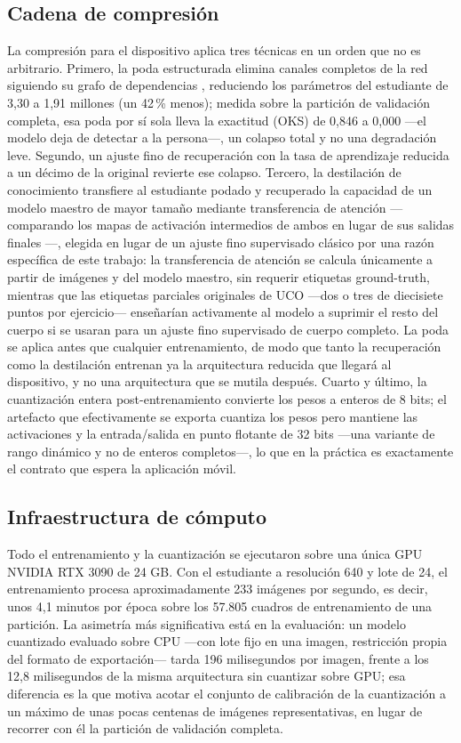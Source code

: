 \documentclass[10pt,a4paper,twocolumn]{article}
\begin{document}
\subsection{Cadena de compresión}
\label{sec:cadena}
La compresión para el dispositivo aplica tres técnicas en un orden que no es
arbitrario. Primero, la poda estructurada elimina canales completos de la red
siguiendo su grafo de dependencias \cite{fang2023}, reduciendo los parámetros
del estudiante de 3,30 a 1,91 millones (un 42\,\% menos); medida sobre la
partición de validación completa, esa poda por sí sola lleva la exactitud
(OKS) de 0,846 a 0,000 —el modelo deja de detectar a la persona—, un colapso
total y no una degradación leve. Segundo, un ajuste fino de recuperación con
la tasa de aprendizaje reducida a un décimo de la original revierte ese
colapso. Tercero, la destilación de conocimiento transfiere al estudiante
podado y recuperado la capacidad de un modelo maestro de mayor tamaño
mediante transferencia de atención \cite{zagoruyko2017} —comparando los
mapas de activación intermedios de ambos en lugar de sus salidas finales
\cite{hinton2015}—, elegida en lugar de un ajuste fino supervisado clásico
por una razón específica de este trabajo: la transferencia de atención se
calcula únicamente a partir de imágenes y del modelo maestro, sin requerir
etiquetas ground-truth, mientras que las etiquetas parciales originales de
UCO —dos o tres de diecisiete puntos por ejercicio— enseñarían activamente
al modelo a suprimir el resto del cuerpo si se usaran para un ajuste fino
supervisado de cuerpo completo. La poda se aplica antes que cualquier
entrenamiento, de modo que tanto la recuperación como la destilación entrenan
ya la arquitectura reducida que llegará al dispositivo, y no una arquitectura
que se mutila después. Cuarto y último, la cuantización entera
post-entrenamiento \cite{jacob2018} convierte los pesos a enteros de 8 bits;
el artefacto que efectivamente se exporta cuantiza los pesos pero mantiene
las activaciones y la entrada/salida en punto flotante de 32 bits —una
variante de rango dinámico y no de enteros completos—, lo que en la práctica
es exactamente el contrato que espera la aplicación móvil.

\subsection{Infraestructura de cómputo}
Todo el entrenamiento y la cuantización se ejecutaron sobre una única GPU
NVIDIA RTX 3090 de 24 GB. Con el estudiante a resolución 640 y lote de 24, el
entrenamiento procesa aproximadamente 233 imágenes por segundo, es decir,
unos 4,1 minutos por época sobre los 57.805 cuadros de entrenamiento de una
partición. La asimetría más significativa está en la evaluación: un modelo
cuantizado evaluado sobre CPU —con lote fijo en una imagen, restricción
propia del formato de exportación— tarda 196 milisegundos por imagen, frente
a los 12,8 milisegundos de la misma arquitectura sin cuantizar sobre GPU; esa
diferencia es la que motiva acotar el conjunto de calibración de la
cuantización a un máximo de unas pocas centenas de imágenes representativas,
en lugar de recorrer con él la partición de validación completa.
\end{document}
